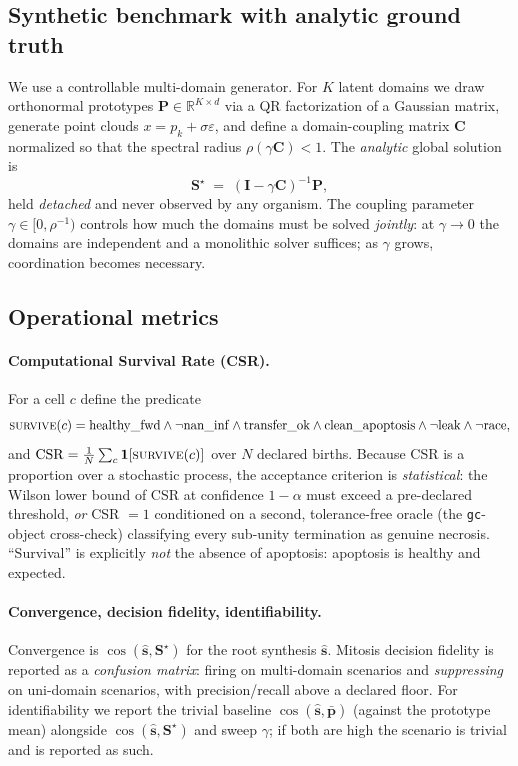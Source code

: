 \documentclass[11pt]{article}
\newcommand{\R}{\mathbb{R}}
\newcommand{\Iden}{\mathbf{I}}
\begin{document}
\subsection{Synthetic benchmark with analytic ground truth}
We use a controllable multi-domain generator. For $K$ latent domains we draw
orthonormal prototypes $\mathbf{P}\in\R^{K\times d}$ via a QR factorization of a
Gaussian matrix, generate point clouds $x=p_k+\sigma\varepsilon$, and define a
domain-coupling matrix $\mathbf{C}$ normalized so that the spectral radius
$\rho(\gamma\mathbf{C})<1$. The \emph{analytic} global solution is
\begin{equation}
\mathbf{S}^\star \;=\; (\Iden - \gamma\mathbf{C})^{-1}\mathbf{P},
\label{eq:groundtruth}
\end{equation}
held \emph{detached} and never observed by any organism. The coupling parameter
$\gamma\in[0,\rho^{-1})$ controls how much the domains must be solved
\emph{jointly}: at $\gamma\to0$ the domains are independent and a monolithic
solver suffices; as $\gamma$ grows, coordination becomes necessary.

\subsection{Operational metrics}
\paragraph{Computational Survival Rate (CSR).}
For a cell $c$ define the predicate
\begin{equation}
\textsc{survive}(c) = \mathrm{healthy\_fwd} \wedge \neg\mathrm{nan\_inf}
\wedge \mathrm{transfer\_ok} \wedge \mathrm{clean\_apoptosis}
\wedge \neg\mathrm{leak} \wedge \neg\mathrm{race},
\end{equation}
and $\mathrm{CSR}=\frac{1}{N}\sum_{c}\mathbf{1}[\textsc{survive}(c)]$ over $N$
declared births. Because CSR is a proportion over a stochastic process, the
acceptance criterion is \emph{statistical}: the Wilson \cite{wilson1927interval}
lower bound of CSR at confidence $1-\alpha$ must exceed a pre-declared threshold,
\emph{or} CSR $=1$ conditioned on a second, tolerance-free oracle (the
\texttt{gc}-object cross-check) classifying every sub-unity termination as
genuine necrosis. ``Survival'' is explicitly \emph{not} the absence of
apoptosis: apoptosis is healthy and expected.

\paragraph{Convergence, decision fidelity, identifiability.}
Convergence is $\cos(\hat{\mathbf{s}}, \mathbf{S}^\star)$ for the root synthesis
$\hat{\mathbf{s}}$. Mitosis decision fidelity is reported as a \emph{confusion
matrix}: firing on multi-domain scenarios and \emph{suppressing} on uni-domain
scenarios, with precision/recall above a declared floor. For identifiability we
report the trivial baseline $\cos(\hat{\mathbf{s}}, \bar{\mathbf{p}})$ (against
the prototype mean) alongside $\cos(\hat{\mathbf{s}}, \mathbf{S}^\star)$ and
sweep $\gamma$; if both are high the scenario is trivial and is reported as such.
\end{document}
